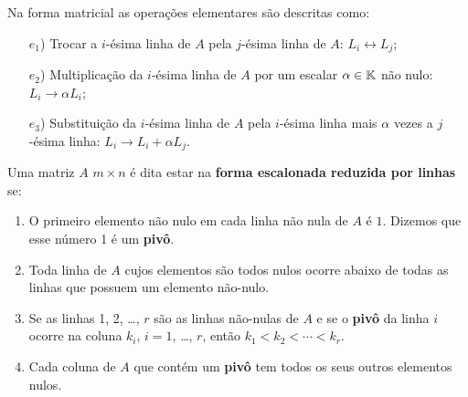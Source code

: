 Na forma matricial  as opera\c{c}\~oes elementares s\~ao descritas como:

\vspace{.3cm}

\begin{itemize}
    \item[$e_1$)] Trocar a $i$-\'esima linha de $A$  pela $j$-\'esima linha de $A$:  $L_i \leftrightarrow L_j$;

    \vspace{.3cm}

    \item[$e_2$)] Multiplica\c{c}\~ao da $i$-\'esima linha de $A$  por um escalar $\alpha \in \mathbb{K}$ n\~ao nulo:  $L_i \rightarrow \alpha L_i$;

    \vspace{.3cm}

   \item[$e_3$)] Substitui\c{c}\~ao da $i$-\'esima linha de $A$  pela $i$-\'esima linha mais $\alpha$ vezes a $j$-\'esima linha:  $L_i \rightarrow L_i + \alpha L_j$.
\end{itemize}



\begin{definicao}\label{linhareduzida}
    Uma matriz $A$ $m \times n$ \'e  dita estar na \textbf{forma escalonada reduzida por linhas} se:
    \begin{enumerate}[label={\roman*})]
        \item O primeiro elemento n\~ao nulo  em cada linha n\~ao nula de $A$  \'e $1$.  Dizemos que esse número 1 é um \textbf{pivô}.

        \vspace{.3cm}

        \item Toda linha de $A$ cujos elementos s\~ao todos nulos  ocorre abaixo de todas as linhas que possuem um elemento n\~ao-nulo. 

        \vspace{.3cm}

        \item Se as linhas 1, 2, \dots, $r$ s\~ao as linhas n\~ao-nulas de $A$  e se o \textbf{pivô} da linha $i$ ocorre na coluna $k_i$,  $i = 1$, \dots, $r$,  ent\~ao $k_1 < k_2 < \cdots < k_r$.

        \vspace{.3cm}

        \item Cada coluna de $A$ que cont\'em um \textbf{pivô}  tem todos os seus outros elementos nulos.
    \end{enumerate}
\end{definicao}

